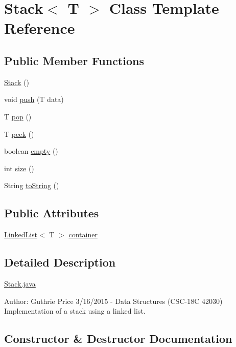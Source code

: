 \hypertarget{class_stack}{}\section{Stack$<$ T $>$ Class Template Reference}
\label{class_stack}
\subsection*{Public Member Functions}
\begin{DoxyCompactItemize}
\item 
\hyperlink{class_stack_ae17728cf7d6856394c141d26dee8d3ac}{Stack} ()
\item 
void \hyperlink{class_stack_abb7eef0249d429b74486ab0063fc21c3}{push} (T data)
\item 
T \hyperlink{class_stack_a8c0776ba1b97449f3ed6c31035c983eb}{pop} ()
\item 
T \hyperlink{class_stack_a1789db27a750156f76be73551c4f1766}{peek} ()
\item 
boolean \hyperlink{class_stack_aba55fff63cbaec992328098cd21af7cf}{empty} ()
\item 
int \hyperlink{class_stack_af457b19c4596d16ed2392fa203b144d3}{size} ()
\item 
String \hyperlink{class_stack_a648cd7e04068ee38bb2ee45091d4c36b}{to\+String} ()
\end{DoxyCompactItemize}
\subsection*{Public Attributes}
\begin{DoxyCompactItemize}
\item 
\hyperlink{class_linked_list}{Linked\+List}$<$ T $>$ \hyperlink{class_stack_a3017fdb3715e4a0c8c81bdaa7c231a2c}{container}
\end{DoxyCompactItemize}


\subsection{Detailed Description}
\hyperlink{_stack_8java}{Stack.\+java}

Author\+: Guthrie Price 3/16/2015 -\/ Data Structures (C\+S\+C-\/18\+C 42030) Implementation of a stack using a linked list. 

\subsection{Constructor \& Destructor Documentation}
\hypertarget{class_stack_ae17728cf7d6856394c141d26dee8d3ac}{}
